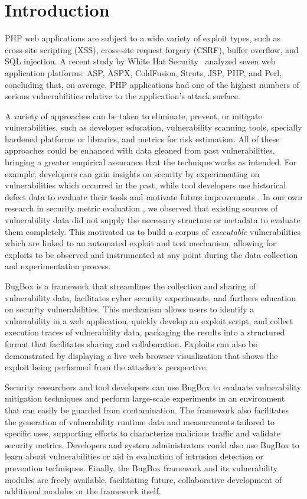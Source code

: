 \documentclass[letterpaper,twocolumn,10pt]{article}
\begin{document}
\section{Introduction}
PHP web applications are subject to a wide variety of exploit types, such as cross-site scripting (XSS), cross-site request forgery (CSRF), buffer overflow, and SQL injection.  A recent study by White Hat Security~\cite{WhiteHat:2010:Online} analyzed seven web application platforms: ASP, ASPX, ColdFusion, Struts, JSP, PHP, and Perl, concluding that, on average, PHP applications had one of the highest numbers of serious vulnerabilities relative to the application's attack surface.

A variety of approaches can be taken to eliminate, prevent, or mitigate vulnerabilities, such as developer education, vulnerability scanning tools, specially hardened platforms or libraries, and metrics for risk estimation. All of these approaches could be enhanced with data gleaned from past vulnerabilities, bringing a greater empirical assurance that the technique works as intended. For example, developers can gain insights on security by experimenting on vulnerabilities which occurred in the past, while tool developers use historical defect data to evaluate their tools and motivate future improvements \cite{miningbugfinding}. In our own research in security metric evaluation \cite{metrisec2012surface}, we observed that existing sources of vulnerability data did not supply the necessary structure or metadata to evaluate them completely. This motivated us to build a corpus of \textit{executable} vulnerabilities which are linked to an automated exploit and test mechanism, allowing for exploits to be observed and instrumented at any point during the data collection and experimentation process.

BugBox is a framework that streamlines the collection and sharing of vulnerability data, facilitates cyber security experiments, and furthers education on security vulnerabilities.  This mechanism allows users to identify a vulnerability in a web application, quickly develop an exploit script, and collect execution traces of vulnerability data, packaging the results into a structured format that facilitates sharing and collaboration. Exploits can also be demonstrated by displaying a live web browser visualization that shows the exploit being performed from the attacker's perspective.

Security researchers and tool developers can use BugBox to evaluate vulnerability mitigation techniques and perform large-scale experiments in an environment that can easily be guarded from contamination. The framework also facilitates the generation of vulnerability runtime data and measurements tailored to specific uses, supporting efforts to characterize malicious traffic and validate security metrics. Developers and system administrators could also use BugBox to learn about vulnerabilities or aid in evaluation of intrusion detection or prevention techniques. Finally, the BugBox framework and its vulnerability modules are freely available, facilitating future, collaborative development of additional modules or the framework itself.
\end{document}
